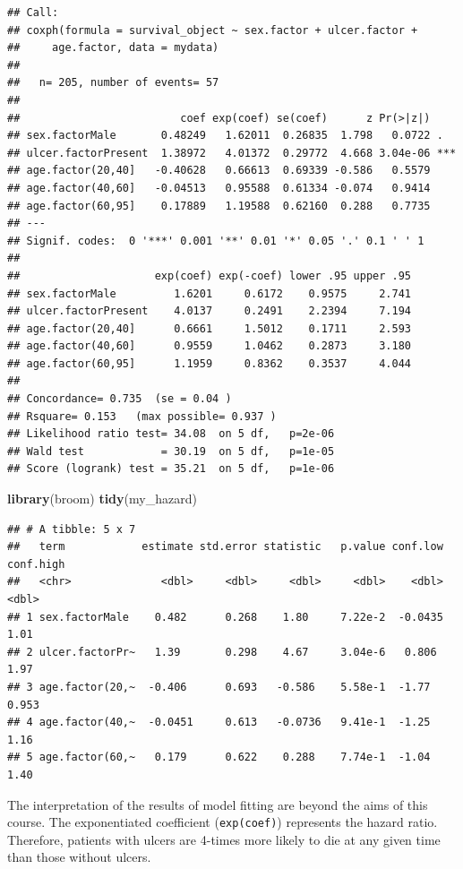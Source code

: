 \documentclass[12pt,]{krantz}
\makeatletter
\newenvironment{Shaded}{\begin{snugshade}}{\end{snugshade}}
\newcommand{\KeywordTok}[1]{\textcolor[rgb]{0.13,0.29,0.53}{\textbf{#1}}}
\newcommand{\NormalTok}[1]{#1}
\newenvironment{kframe}{%
\medskip{}
\setlength{\fboxsep}{.8em}
 \def\at@end@of@kframe{}%
 \ifinner\ifhmode%
  \def\at@end@of@kframe{\end{minipage}}%
  \begin{minipage}{\columnwidth}%
 \fi\fi%
 \def\FrameCommand##1{\hskip\@totalleftmargin \hskip-\fboxsep
 \colorbox{shadecolor}{##1}\hskip-\fboxsep
     \hskip-\linewidth \hskip-\@totalleftmargin \hskip\columnwidth}%
 \MakeFramed {\advance\hsize-\width
   \@totalleftmargin\z@ \linewidth\hsize
   \@setminipage}}%
 {\par\unskip\endMakeFramed%
 \at@end@of@kframe}
\renewenvironment{Shaded}{\begin{kframe}}{\end{kframe}}
\theoremstyle{definition}
\theoremstyle{definition}
\theoremstyle{definition}
\theoremstyle{remark}
\makeatother
\begin{document}
\begin{verbatim}
## Call:
## coxph(formula = survival_object ~ sex.factor + ulcer.factor + 
##     age.factor, data = mydata)
## 
##   n= 205, number of events= 57 
## 
##                         coef exp(coef) se(coef)      z Pr(>|z|)    
## sex.factorMale       0.48249   1.62011  0.26835  1.798   0.0722 .  
## ulcer.factorPresent  1.38972   4.01372  0.29772  4.668 3.04e-06 ***
## age.factor(20,40]   -0.40628   0.66613  0.69339 -0.586   0.5579    
## age.factor(40,60]   -0.04513   0.95588  0.61334 -0.074   0.9414    
## age.factor(60,95]    0.17889   1.19588  0.62160  0.288   0.7735    
## ---
## Signif. codes:  0 '***' 0.001 '**' 0.01 '*' 0.05 '.' 0.1 ' ' 1
## 
##                     exp(coef) exp(-coef) lower .95 upper .95
## sex.factorMale         1.6201     0.6172    0.9575     2.741
## ulcer.factorPresent    4.0137     0.2491    2.2394     7.194
## age.factor(20,40]      0.6661     1.5012    0.1711     2.593
## age.factor(40,60]      0.9559     1.0462    0.2873     3.180
## age.factor(60,95]      1.1959     0.8362    0.3537     4.044
## 
## Concordance= 0.735  (se = 0.04 )
## Rsquare= 0.153   (max possible= 0.937 )
## Likelihood ratio test= 34.08  on 5 df,   p=2e-06
## Wald test            = 30.19  on 5 df,   p=1e-05
## Score (logrank) test = 35.21  on 5 df,   p=1e-06
\end{verbatim}

\begin{Shaded}
\begin{Highlighting}[]
\KeywordTok{library}\NormalTok{(broom)}
\KeywordTok{tidy}\NormalTok{(my_hazard)}
\end{Highlighting}
\end{Shaded}

\begin{verbatim}
## # A tibble: 5 x 7
##   term            estimate std.error statistic   p.value conf.low conf.high
##   <chr>              <dbl>     <dbl>     <dbl>     <dbl>    <dbl>     <dbl>
## 1 sex.factorMale    0.482      0.268    1.80     7.22e-2  -0.0435     1.01 
## 2 ulcer.factorPr~   1.39       0.298    4.67     3.04e-6   0.806      1.97 
## 3 age.factor(20,~  -0.406      0.693   -0.586    5.58e-1  -1.77       0.953
## 4 age.factor(40,~  -0.0451     0.613   -0.0736   9.41e-1  -1.25       1.16 
## 5 age.factor(60,~   0.179      0.622    0.288    7.74e-1  -1.04       1.40
\end{verbatim}

The interpretation of the results of model fitting are beyond the aims
of this course. The exponentiated coefficient (\texttt{exp(coef)})
represents the hazard ratio. Therefore, patients with ulcers are 4-times
more likely to die at any given time than those without ulcers.
\end{document}
